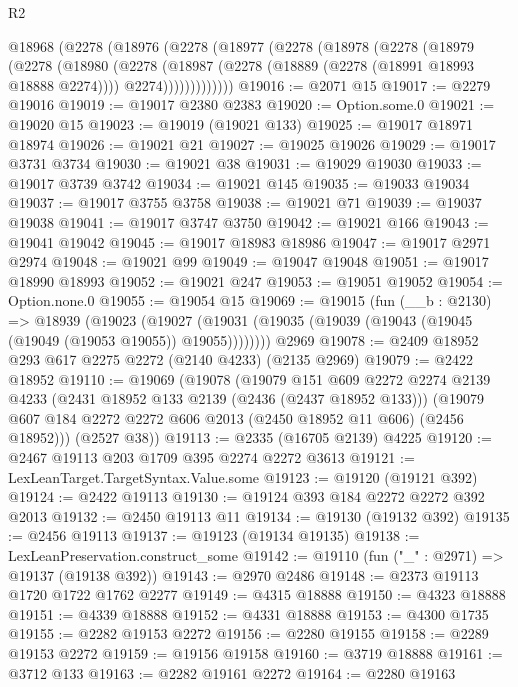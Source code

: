 \begin{lexlean}{R2}
\begin{coremodule}
    @18968
      (@2278
        (@18976
          (@2278
            (@18977
              (@2278
                (@18978
                  (@2278
                    (@18979
                      (@2278
                        (@18980
                          (@2278
                            (@18987
                              (@2278 (@18889 (@2278 (@18991 @18993 @18888 @2274))))
                              @2274)))))))))))))
@19016 := @2071 @15
@19017 := @2279 @19016
@19019 := @19017 @2380 @2383
@19020 := Option.some.{0}
@19021 := @19020 @15
@19023 := @19019 (@19021 @133)
@19025 := @19017 @18971 @18974
@19026 := @19021 @21
@19027 := @19025 @19026
@19029 := @19017 @3731 @3734
@19030 := @19021 @38
@19031 := @19029 @19030
@19033 := @19017 @3739 @3742
@19034 := @19021 @145
@19035 := @19033 @19034
@19037 := @19017 @3755 @3758
@19038 := @19021 @71
@19039 := @19037 @19038
@19041 := @19017 @3747 @3750
@19042 := @19021 @166
@19043 := @19041 @19042
@19045 := @19017 @18983 @18986
@19047 := @19017 @2971 @2974
@19048 := @19021 @99
@19049 := @19047 @19048
@19051 := @19017 @18990 @18993
@19052 := @19021 @247
@19053 := @19051 @19052
@19054 := Option.none.{0}
@19055 := @19054 @15
@19069 := @19015
    (fun (__b : @2130) =>
    @18939
      (@19023
        (@19027 (@19031 (@19035 (@19039 (@19043 (@19045 (@19049 (@19053 @19055)) @19055))))))))
    @2969
@19078 := @2409 @18952 @293 @617 @2275 @2272 (@2140 @4233) (@2135 @2969)
@19079 := @2422 @18952
@19110 := @19069
    (@19078
      (@19079
        @151
        @609
        @2272
        @2274
        @2139
        @4233
        (@2431 @18952 @133 @2139 (@2436 (@2437 @18952 @133)))
        (@19079 @607 @184 @2272 @2272 @606 @2013 (@2450 @18952 @11 @606) (@2456 @18952)))
      (@2527 @38))
@19113 := @2335 (@16705 @2139) @4225
@19120 := @2467 @19113 @203 @1709 @395 @2274 @2272 @3613
@19121 := LexLeanTarget.TargetSyntax.Value.some
@19123 := @19120 (@19121 @392)
@19124 := @2422 @19113
@19130 := @19124 @393 @184 @2272 @2272 @392 @2013
@19132 := @2450 @19113 @11
@19134 := @19130 (@19132 @392)
@19135 := @2456 @19113
@19137 := @19123 (@19134 @19135)
@19138 := LexLeanPreservation.construct_some
@19142 := @19110 (fun ("_" : @2971) => @19137 (@19138 @392))
@19143 := @2970 @2486
@19148 := @2373 @19113 @1720 @1722 @1762 @2277
@19149 := @4315 @18888
@19150 := @4323 @18888
@19151 := @4339 @18888
@19152 := @4331 @18888
@19153 := @4300 @1735
@19155 := @2282 @19153 @2272
@19156 := @2280 @19155
@19158 := @2289 @19153 @2272
@19159 := @19156 @19158
@19160 := @3719 @18888
@19161 := @3712 @133
@19163 := @2282 @19161 @2272
@19164 := @2280 @19163

\end{coremodule}
\end{lexlean}
